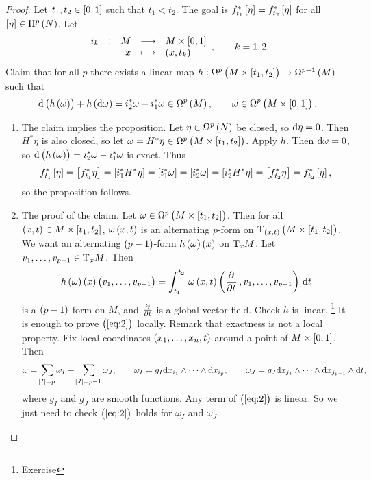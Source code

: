 \begin{proof}
Let $ t_1, t_2 \in \sbr{0, 1} $ such that $ t_1 < t_2 $. The goal is $ f_{t_1}^*\sbr{\eta} = f_{t_2}^*\sbr{\eta} $ for all $ \sbr{\eta} \in \H^p\br{N} $. Let
$$ \function[i_k]{M}{M \times \sbr{0, 1}}{x}{\br{x, t_k}}, \qquad k = 1, 2. $$
Claim that for all $ p $ there exists a linear map $ h : \Omega^p\br{M \times \sbr{t_1, t_2}} \to \Omega^{p - 1}\br{M} $ such that
\begin{equation}
\label{eq:2}
\d\br{h\br{\omega}} + h\br{\d\omega} = i_2^*\omega - i_1^*\omega \in \Omega^p\br{M}, \qquad \omega \in \Omega^p\br{M \times \sbr{0, 1}}.
\end{equation}
\begin{enumerate}[label=Step \arabic*., leftmargin=0.5in]
\item The claim implies the proposition. Let $ \eta \in \Omega^p\br{N} $ be closed, so $ \mathrm{d}\eta = 0 $. Then $ H^*\eta $ is also closed, so let $ \omega = H^*\eta \in \Omega^p\br{M \times \sbr{t_1, t_2}} $. Apply $ h $. Then $ \mathrm{d}\omega = 0 $, so $ \d\br{h\br{\omega}} = i_2^*\omega - i_1^*\omega $ is exact. Thus
$$ f_{t_1}^*\sbr{\eta} = \sbr{f_{t_1}^*\eta} = \sbr{i_1^*H^*\eta} = \sbr{i_1^*\omega} = \sbr{i_2^*\omega} = \sbr{i_2^*H^*\eta} = \sbr{f_{t_2}^*\eta} = f_{t_2}^*\sbr{\eta}, $$
so the proposition follows.


\item The proof of the claim. Let $ \omega \in \Omega^p\br{M \times \sbr{t_1, t_2}} $. Then for all $ \br{x, t} \in M \times \sbr{t_1, t_2} $, $ \omega\br{x, t} $ is an alternating $ p $-form on $ \T_{\br{x, t}}\br{M \times \sbr{t_1, t_2}} $. We want an alternating $ \br{p - 1} $-form $ h\br{\omega}\br{x} $ on $ \mathrm{T}_xM $. Let $ v_1, \dots, v_{p - 1} \in \mathrm{T}_xM $. Then
$$ h\br{\omega}\br{x}\br{v_1, \dots, v_{p - 1}} = \intd{t_1}{t_2}{\omega\br{x, t}\br{\dpd{}{t}, v_1, \dots, v_{p - 1}}}{t} $$
is a $ \br{p - 1} $-form on $ M $, and $ \tpd{}{t} $ is a global vector field. Check $ h $ is linear. \footnote{Exercise} It is enough to prove $ \br{\ref{eq:2}} $ locally. Remark that exactness is not a local property. Fix local coordinates $ \br{x_1, \dots, x_n, t} $ around a point of $ M \times \sbr{0, 1} $. Then
$$ \omega = \sum_{\abs{I} = p} \omega_I + \sum_{\abs{J} = p - 1} \omega_J, \qquad \omega_I = g_I \mathrm{d} x_{i_1} \wedge \dots \wedge \mathrm{d} x_{i_p}, \qquad \omega_J = g_J \mathrm{d} x_{j_1} \wedge \dots \wedge \mathrm{d} x_{j_{p - 1}} \wedge \mathrm{d} t, $$
where $ g_I $ and $ g_J $ are smooth functions. Any term of $ \br{\ref{eq:2}} $ is linear. So we just need to check $ \br{\ref{eq:2}} $ holds for $ \omega_I $ and $ \omega_J $.


\end{enumerate}
\end{proof}
